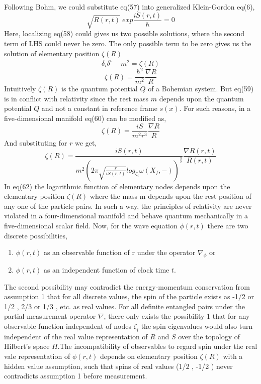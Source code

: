 \documentclass{article}
\begin{document}
 Following Bohm, we could substitute eq(57) into generalized Klein-Gordon eq(6),
 \begin{equation}
  [\delta_{i} \delta^{i}- m^2-\zeta (R)]\sqrt{R(r,t)} \ exp \frac{iS(r,t)}{\hbar} = 0  
 \end{equation} Here, localizing eq(58) could gives us two possible solutions, where the second term of LHS could never be zero. The only possible term to be zero gives us the solution of elementary position $\zeta (R)$ \begin{equation}
     \delta_{i} \delta^{i}- m^2 = \zeta (R) 
 \end{equation}
 \begin{equation}
     \zeta (R) = \frac{\hbar^2}{m^2} \frac{\nabla R}{R} 
 \end{equation} Intuitively $\zeta (R)$ is the quantum potential $Q$ of a Bohemian system. But eq(59) is in conflict with relativity since the rest mass $m$ depends upon the quantum potential $Q$ and not a constant in reference frame $s(x)$. For such reasons, in a five-dimensional manifold eq(60) can be modified as,
 \begin{equation}
     \zeta (R) = \frac{iS}{m^2 r^3} \frac{\nabla R}{R} 
 \end{equation} And substituting for $r$ we get,
 \begin{equation}
       \zeta (R) = \frac{iS(r,t)}{m^2 (2 \pi \sqrt{\frac{r}{iS(r,t)}} log_{\zeta_i} \omega (X_f, -))^{\frac{3}{2}}}  \frac{\nabla R(r,t)}{R(r,t)} 
 \end{equation}
 In eq(62) the logarithmic function of elementary nodes depends upon the elementary position $\zeta (R)$ where the mass m depends upon the rest position of any one of the particle pairs. In such a way, the principles of relativity are never violated in a four-dimensional manifold and behave quantum mechanically in a five-dimensional scalar  field. \newline
 Now, for the wave equation $\phi (r,t)$ there are two discrete possibilities, \begin{enumerate}
     \item $\phi (r,t)$ as an observable function of r under the operator $\nabla_\phi$ or
     \item   $\phi (r,t)$ as an independent function of clock time $t$.
 \end{enumerate}
 The second possibility may contradict the energy-momentum conservation from assumption 1 that for all discrete values, the spin of the particle exists as  -1/2 or  1/2 , 2/3 or 1/3 , etc. as real values. For all definite entangled pairs under the partial measurement operator $\nabla$, there only exists the possibility 1 that for any observable function independent of nodes $\zeta_i$ the spin eigenvalues would also turn independent of the real value representation of $R$ and $S$ over the topology of Hilbert's space $H$.\newline The incompatibility of observables to regard spin under the real vale representation of $\phi (r,t)$ depends on elementary position $\zeta (R)$ with a hidden value assumption, such that spins of real values (1/2 , -1/2 ) never contradicts assumption 1 before measurement.
\end{document}

